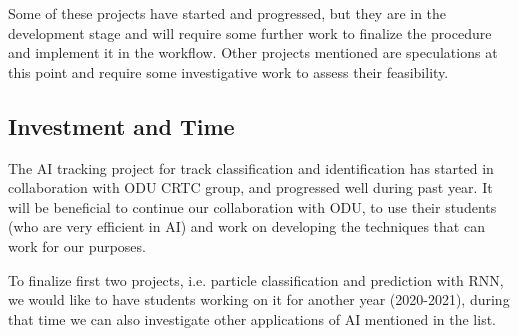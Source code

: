 \documentclass[11pt]{revtex4}
\begin{document}
Some of these projects have started and progressed, but they are in the development stage and
will require some further work to finalize the procedure and implement it in the workflow.
Other projects mentioned are speculations at this point and require some investigative work
to assess their feasibility.

\subsection{Investment and Time}

The AI tracking project for track classification and identification has started in collaboration
with ODU CRTC group, and progressed well during past year. It will be beneficial to continue
our collaboration with ODU, to use their students (who are very efficient in AI) and
work on developing the techniques that can work for our purposes.

To finalize first two projects, i.e. particle classification and prediction with RNN,
we would like to have students working on it for another year (2020-2021), during
that time we can also investigate other applications of AI mentioned in the list.
\end{document}
